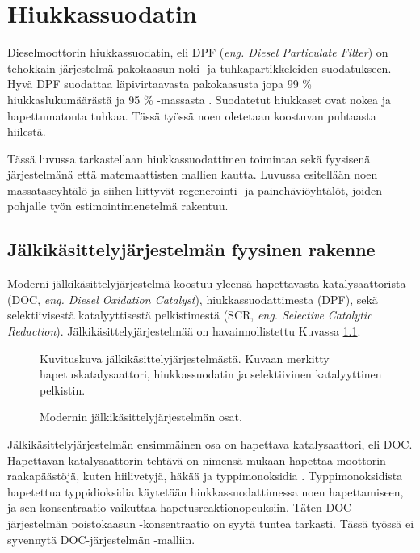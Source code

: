 \chapter{Hiukkassuodatin}%
\label{ch:dpf}



Dieselmoottorin hiukkassuodatin, eli DPF (\emph{eng. Diesel Particulate Filter}) on tehokkain järjestelmä pakokaasun noki- ja tuhkapartikkeleiden suodatukseen. 
Hyvä DPF suodattaa läpivirtaavasta pakokaasusta jopa 99 \% hiukkaslukumäärästä ja 95 \% -massasta \cite{Yan_state_of_the_art}. Suodatetut hiukkaset ovat nokea ja hapettumatonta tuhkaa. Tässä työssä noen oletetaan koostuvan puhtaasta hiilestä. 



Tässä luvussa tarkastellaan hiukkassuodattimen toimintaa sekä fyysisenä järjestelmänä että matemaattisten mallien kautta. Luvussa esitellään noen massataseyhtälö ja siihen liittyvät regenerointi- ja painehäviöyhtälöt, joiden pohjalle työn estimointimenetelmä rakentuu.


\section{Jälkikäsittelyjärjestelmän fyysinen rakenne}
Moderni jälkikäsittelyjärjestelmä koostuu yleensä hapettavasta katalysaattorista (DOC, \emph{eng. Diesel Oxidation Catalyst}), hiukkassuodattimesta (DPF), sekä selektiivisestä katalyyttisestä pelkistimestä (SCR, \emph{eng. Selective Catalytic Reduction}). 
Jälkikäsittelyjärjestelmää on havainnollistettu Kuvassa \ref{fig:EAT_full}. %
%
\begin{figure}[H]
    \centering
                {Kuvituskuva jälkikäsittelyjärjestelmästä. Kuvaan merkitty hapetuskatalysaattori, hiukkassuodatin ja selektiivinen katalyyttinen pelkistin.}
    \caption{Modernin jälkikäsittelyjärjestelmän osat.}
    \label{fig:EAT_full}
\end{figure}
%
Jälkikäsittelyjärjestelmän ensimmäinen osa on hapettava katalysaattori, eli DOC. 
Hapettavan katalysaattorin tehtävä on nimensä mukaan hapettaa moottorin raakapäästöjä, kuten hiilivetyjä, häkää ja typpimonoksidia \cite{dieselnet_doc}. Typpimonoksidista hapetettua typpidioksidia käytetään hiukkassuodattimessa noen hapettamiseen, ja sen konsentraatio vaikuttaa hapetusreaktionopeuksiin. Täten DOC-järjestelmän poistokaasun -konsentraatio on syytä tuntea tarkasti. Tässä työssä ei syvennytä DOC-järjestelmän -malliin.

